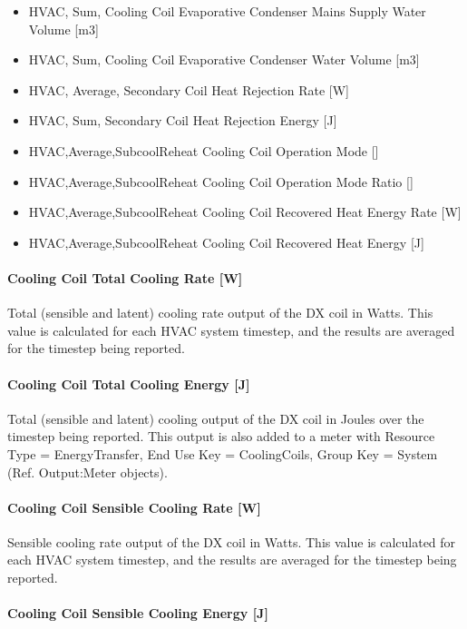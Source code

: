 \begin{itemize}
\item HVAC, Sum, Cooling Coil Evaporative Condenser Mains Supply Water Volume {[}m3{]}
\item HVAC, Sum, Cooling Coil Evaporative Condenser Water Volume {[}m3{]}
\item HVAC, Average, Secondary Coil Heat Rejection Rate {[}W{]}
\item HVAC, Sum, Secondary Coil Heat Rejection Energy {[}J{]}
\item
  HVAC,Average,SubcoolReheat Cooling Coil Operation Mode {[]}
\item
  HVAC,Average,SubcoolReheat Cooling Coil Operation Mode Ratio {[]}
\item
  HVAC,Average,SubcoolReheat Cooling Coil Recovered Heat Energy Rate {[}W{]}
\item
  HVAC,Average,SubcoolReheat Cooling Coil Recovered Heat Energy {[}J{]}
\end{itemize}

\paragraph{Cooling Coil Total Cooling Rate {[}W{]}}

Total (sensible and latent) cooling rate output of the DX coil in Watts. This value is calculated for each HVAC system timestep, and the results are averaged for the timestep being reported.

\paragraph{Cooling Coil Total Cooling Energy {[}J{]}}

Total (sensible and latent) cooling output of the DX coil in Joules over the timestep being reported. This output is also added to a meter with Resource Type = EnergyTransfer, End Use Key = CoolingCoils, Group Key = System (Ref. Output:Meter objects).

\paragraph{Cooling Coil Sensible Cooling Rate {[}W{]}}

Sensible cooling rate output of the DX coil in Watts. This value is calculated for each HVAC system timestep, and the results are averaged for the timestep being reported.

\paragraph{Cooling Coil Sensible Cooling Energy {[}J{]}}

